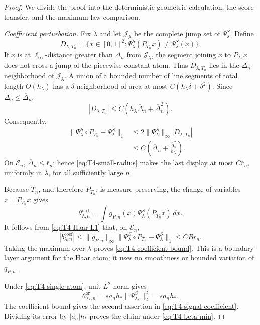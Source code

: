 \documentclass[11pt]{article}
\theoremstyle{definition}
\newcommand{\1}{\mathbf 1}\newcommand{\op}{\operatorname}
\begin{document}
\begin{proof}
We divide the proof into the deterministic geometric calculation,
the score transfer, and the maximum-law comparison.

\emph{Coefficient perturbation.}
Fix $\lambda$ and let $\mathcal J_\lambda$ be the complete jump set
of $\Psi_\lambda^S$.  Define
\[
 D_{\lambda,T_n}
 =\{x\in[0,1]^2:
      \Psi_\lambda^S(P_{T_n}x)\ne\Psi_\lambda^S(x)\}.
\]
If $x$ is at $\ell_\infty$-distance greater than $\Delta_n$ from
$\mathcal J_\lambda$, the segment joining $x$ to $P_{T_n}x$ does not
cross a jump of the piecewise-constant atom.  Thus
$D_{\lambda,T_n}$ lies in the $\Delta_n$-neighborhood of
$\mathcal J_\lambda$.  A union of a bounded number of line segments
of total length $O(h_\lambda)$ has a $\delta$-neighborhood of area at
most $C(h_\lambda\delta+\delta^2)$.  Since
$\Delta_n\le\overline\Delta_n$,
\begin{equation}
 |D_{\lambda,T_n}|
 \le C(h_\lambda\overline\Delta_n
        +\overline\Delta_n^2).
 \label{eq:T4-boundary-layer-area}
\end{equation}
Consequently,
\begin{align}
 \|\Psi_\lambda^S\circ P_{T_n}-\Psi_\lambda^S\|_1
 &\le2\|\Psi_\lambda^S\|_\infty
       |D_{\lambda,T_n}|\nonumber\\
 &\le C\left(
       \overline\Delta_n+
       \frac{\overline\Delta_n^2}{h_\lambda}
       \right).
 \label{eq:T4-Haar-L1}
\end{align}
On $\mathcal E_n$,
$\overline\Delta_n\le\overline r_n$; hence
\eqref{eq:T4-small-radius} makes the last display at most
$C\overline r_n$, uniformly in $\lambda$, for all sufficiently large
$n$.

Because $T_n$, and therefore $P_{T_n}$, is measure preserving, the
change of variables $z=P_{T_n}x$ gives
\[
 \theta_{\lambda,n}^{\mathrm{ord}}
 =\int g_{P,n}(x)
       \Psi_\lambda^S(P_{T_n}x)\,dx.
\]
It follows from \eqref{eq:T4-Haar-L1} that, on $\mathcal E_n$,
\[
 |b_{\lambda,n}^{\mathrm{coef}}|
 \le\|g_{P,n}\|_\infty
    \|\Psi_\lambda^S\circ P_{T_n}-\Psi_\lambda^S\|_1
 \le CB\overline r_n.
\]
Taking the maximum over $\lambda$ proves
\eqref{eq:T4-coefficient-bound}.  This is a boundary-layer argument
for the Haar atom; it uses no smoothness or bounded variation of
$q_{P,n}$.

Under \eqref{eq:T4-single-atom}, unit $L^2$ norm gives
\[
 \theta_{\lambda_*,n}^{\mathrm{or}}
 =s a_nh_*\|\Psi_{\lambda_*}^S\|_2^2
 =s a_nh_*.
\]
The coefficient bound gives the second assertion in
\eqref{eq:T4-signal-coefficient}.  Dividing its error by
$|a_n|h_*$ proves the claim under \eqref{eq:T4-beta-min}.


\end{proof}
\end{document}
